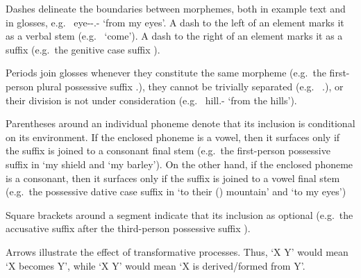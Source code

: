 Dashes delineate the boundaries between morphemes, both in example text and in glosses, e.g.\  eye-\Pl{}-\Poss{}.\Fpl{}-\Abl{} `from my eyes'.
A dash to the left of an element marks it as a verbal stem (e.g.\  `come').
A dash to the right of an element marks it as a suffix (e.g.\ the genitive case suffix ).

Periods join glosses whenever they constitute the same morpheme (e.g.\ the first-person plural possessive suffix  \Poss{}.\Fpl{}), they cannot be trivially separated (e.g.\  \Fsg{}.\Dat{}), or their division is not under consideration (e.g.\  hill.\Pl{}-\Abl{} `from the hills').

Parentheses around an individual phoneme denote that its inclusion is conditional on its environment.
If the enclosed phoneme is a vowel, then it surfaces only if the suffix is joined to a consonant final stem (e.g.\ the first-person possessive suffix  in  `my shield and  `my barley').
On the other hand, if the enclosed phoneme is a consonant, then it surfaces only if the suffix is joined to a vowel final stem (e.g.\ the possessive dative case suffix  in  `to their (\Sg{}) mountain' and  `to my eyes')

Square brackets around a segment indicate that its inclusion as optional (e.g.\ the accusative suffix after the third-person possessive suffix ).

Arrows illustrate the effect of transformative processes.
Thus, `X \becomes{} Y' would mean `X becomes Y', while `X \derivedfrom{} Y' would mean `X is derived/formed from Y'.
